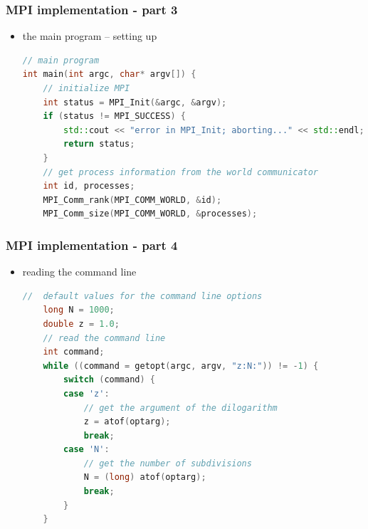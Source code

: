 \begin{frame}[fragile]
%
  \frametitle{MPI implementation - part 3}
%
  \begin{itemize}
  \item the main program -- setting up \mpi
  \begin{lstlisting}[language=c++,name=mpi]
// main program
int main(int argc, char* argv[]) {
    // initialize MPI
    int status = MPI_Init(&argc, &argv);
    if (status != MPI_SUCCESS) {
        std::cout << "error in MPI_Init; aborting..." << std::endl;
        return status;
    }
    // get process information from the world communicator
    int id, processes;
    MPI_Comm_rank(MPI_COMM_WORLD, &id);
    MPI_Comm_size(MPI_COMM_WORLD, &processes);

  \end{lstlisting}
%
  \end{itemize}
%
\end{frame}

\begin{frame}[fragile]
%
  \frametitle{MPI implementation - part 4}
%
  \begin{itemize}
  \item reading the command line
  \begin{lstlisting}[language=c++,name=mpi]
    //  default values for the command line options
    long N = 1000;
    double z = 1.0;
    // read the command line
    int command;
    while ((command = getopt(argc, argv, "z:N:")) != -1) {
        switch (command) {
        case 'z':
            // get the argument of the dilogarithm 
            z = atof(optarg);
            break;
        case 'N':
            // get the number of subdivisions
            N = (long) atof(optarg);
            break;
        }
    }
  \end{lstlisting}
%
  \end{itemize}
%
\end{frame}

